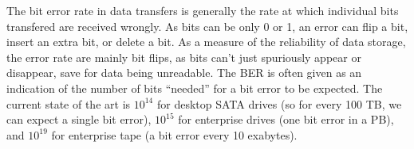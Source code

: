 The bit error rate in data transfers is generally the rate at which individual bits transfered are received wrongly. As bits can be only 0 or 1, an error can flip a bit, insert an extra bit, or delete a bit.
As a measure of the reliability of data storage, the error rate are mainly bit flips, as bits can't just spuriously appear or disappear, save for data being unreadable.  The BER is often given as an indication of the number of bits ``needed'' for a bit error to be expected.  The current state of the art is $10^{14}$ for desktop SATA drives (so for every 100 TB, we can expect a single bit error), $10^{15}$ for enterprise drives (one bit error in a PB), and $10^{19}$ for enterprise tape (a bit error every 10 exabytes).

